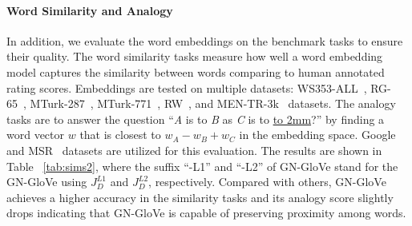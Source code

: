 \paragraph{Word Similarity and Analogy} In addition, we evaluate the word embeddings on the benchmark tasks to ensure their quality. 
The word similarity tasks measure how well a word embedding model captures the similarity between words comparing to human annotated rating scores. Embeddings are tested on multiple datasets:  WS353-ALL~\cite{finkelstein2001placing}, RG-65~\cite{rubenstein1965contextual},  MTurk-287~\cite{radinsky2011word}, MTurk-771~\cite{halawi2012large}, RW~\cite{luong2013better}, and MEN-TR-3k~\cite{bruni2012distributional} datasets.  
The analogy tasks are to answer the question ``\textit{A} is to \textit{B} as \textit{C} is to \underline{\hbox to 2mm{}}?'' by finding a word vector $w$ that is closest to $w_A - w_B + w_C$ in the embedding space.
Google~\cite{mikolov2013efficient} and MSR~\cite{mikolov2013linguistic} datasets are utilized for this evaluation. 
The results are shown in Table ~\ref{tab:sims2}, where the suffix ``-L1'' and ``-L2'' of GN-GloVe stand for the GN-GloVe  using  $J_D^{L1}$ and $J_D^{L2}$, respectively. 
Compared with others, GN-GloVe achieves a higher accuracy in the similarity tasks and its analogy score slightly drops indicating that GN-GloVe is capable of preserving proximity among words. 

